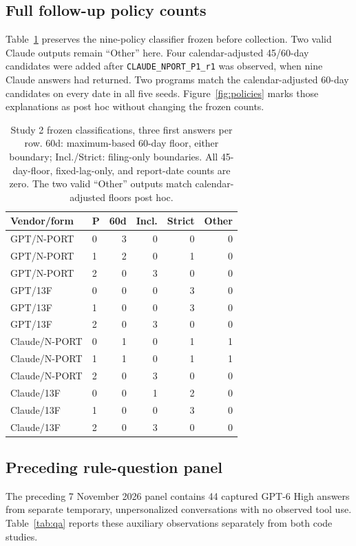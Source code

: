 \documentclass[10pt,twocolumn,a4paper]{article}
\newcommand{\code}[1]{\texttt{#1}}
\begin{document}
\subsection{Full follow-up policy counts}
\label{app:fullresults}
Table~\ref{tab:followup} preserves the nine-policy classifier frozen before collection. Two valid Claude outputs remain ``Other'' here. Four calendar-adjusted 45/60-day candidates were added after \code{CLAUDE\_NPORT\_P1\_r1} was observed, when nine Claude answers had returned. Two programs match the calendar-adjusted 60-day candidates on every date in all five seeds. Figure~\ref{fig:policies} marks those explanations as post hoc without changing the frozen counts.
\begin{table}[htbp]
\centering\small
\setlength{\tabcolsep}{3pt}
\begin{tabular}{llrrrr}
\toprule
Vendor/form & P & 60d & Incl. & Strict & Other\\
\midrule
GPT/N-PORT & 0 & 3 & 0 & 0 & 0\\
GPT/N-PORT & 1 & 2 & 0 & 1 & 0\\
GPT/N-PORT & 2 & 0 & 3 & 0 & 0\\
GPT/13F & 0 & 0 & 0 & 3 & 0\\
GPT/13F & 1 & 0 & 0 & 3 & 0\\
GPT/13F & 2 & 0 & 3 & 0 & 0\\
\midrule
Claude/N-PORT & 0 & 1 & 0 & 1 & 1\\
Claude/N-PORT & 1 & 1 & 0 & 1 & 1\\
Claude/N-PORT & 2 & 0 & 3 & 0 & 0\\
Claude/13F & 0 & 0 & 1 & 2 & 0\\
Claude/13F & 1 & 0 & 0 & 3 & 0\\
Claude/13F & 2 & 0 & 3 & 0 & 0\\
\bottomrule
\end{tabular}
\caption{Study 2 frozen classifications, three first answers per row. 60d: maximum-based 60-day floor, either boundary; Incl./Strict: filing-only boundaries. All 45-day-floor, fixed-lag-only, and report-date counts are zero. The two valid ``Other'' outputs match calendar-adjusted floors post hoc.}
\label{tab:followup}
\end{table}\subsection{Preceding rule-question panel}
\label{app:qa}
The preceding 7 November 2026 panel contains 44 captured GPT-6 High answers from separate temporary, unpersonalized conversations with no observed tool use. Table~\ref{tab:qa} reports these auxiliary observations separately from both code studies.
\end{document}
